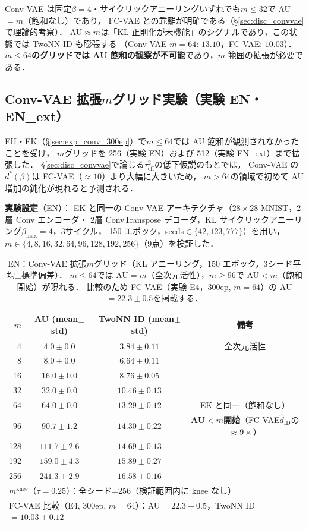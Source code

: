 \documentclass[11pt,a4paper]{jsarticle}
\newcommand{\mknee}{m^{\mathrm{knee}}}
\begin{document}
Conv-VAE は固定$\beta=4$・サイクリックアニーリングいずれでも$m \leq 32$で AU$=m$（飽和なし）であり，
FC-VAE との乖離が明確である（§\ref{sec:disc_convvae}で理論的考察）．
AU$\approx m$は「KL 正則化が未機能」のシグナルであり，この状態では TwoNN ID も膨張する
（Conv-VAE $m=64$: $13.10$，FC-VAE: $10.03$）．
\textbf{$m \leq 64$のグリッドでは AU 飽和の観察が不可能}であり，$m$ 範囲の拡張が必要である．

\subsection{Conv-VAE 拡張$m$グリッド実験（実験 EN・EN\_ext）}\label{sec:exp_en}

EH・EK（§\ref{sec:exp_conv_300ep}）で$m \leq 64$では AU 飽和が観測されなかったことを受け，
$m$グリッドを 256（実験 EN）および 512（実験 EN\_ext）まで拡張した．
§\ref{sec:disc_convvae}で論じる$\tau^2_\mathrm{eff}$の低下仮説のもとでは，
Conv-VAE の$d^*(\beta)$は FC-VAE（$\approx 10$）より大幅に大きいため，
$m>64$の領域で初めて AU 増加の鈍化が現れると予測される．

\textbf{実験設定}（EN）：
EK と同一の Conv-VAE アーキテクチャ（$28\times28$ MNIST，2層 Conv エンコーダ・
2層 ConvTranspose デコーダ，KL サイクリックアニーリング$\beta_\mathrm{max}=4$，3サイクル，
150 エポック，seeds$\in\{42,123,777\}$）を用い，
$m \in \{4, 8, 16, 32, 64, 96, 128, 192, 256\}$（9点）を検証した．

\begin{table}[H]
\centering
\caption{EN：Conv-VAE 拡張$m$グリッド（KL アニーリング，150 エポック，3シード平均$\pm$標準偏差）．
$m \leq 64$では AU$=m$（全次元活性），$m \geq 96$で AU$<m$（飽和開始）が現れる．
比較のため FC-VAE（実験 E4，300ep, $m=64$）の AU$=22.3\pm0.5$を掲載する．}
\label{tab:en}
\small
\begin{tabular}{rccc}
\toprule
$m$ & AU (mean$\pm$std) & TwoNN ID (mean$\pm$std) & 備考 \\
\midrule
  4 & $4.0\pm0.0$   & $3.84\pm0.11$ & 全次元活性 \\
  8 & $8.0\pm0.0$   & $6.64\pm0.11$ & \\
 16 & $16.0\pm0.0$  & $8.76\pm0.05$ & \\
 32 & $32.0\pm0.0$  & $10.46\pm0.13$ & \\
 64 & $64.0\pm0.0$  & $13.29\pm0.12$ & EK と同一（飽和なし） \\
 96 & $\mathbf{90.7\pm1.2}$  & $14.30\pm0.22$ & \textbf{AU$<m$開始}（FC-VAE$\hat{d}_\mathrm{ID}$の$\approx9\times$） \\
128 & $111.7\pm2.6$ & $14.69\pm0.13$ & \\
192 & $159.0\pm4.3$ & $15.89\pm0.27$ & \\
256 & $241.3\pm2.9$ & $16.58\pm0.16$ & \\
\midrule
\multicolumn{4}{l}{$\mknee$（$\tau=0.25$）：全シード=256（検証範囲内に knee なし）} \\
\multicolumn{4}{l}{FC-VAE 比較（E4, 300ep, $m=64$）：AU$=22.3\pm0.5$，TwoNN ID$=10.03\pm0.12$} \\
\bottomrule
\end{tabular}
\end{table}
\end{document}
